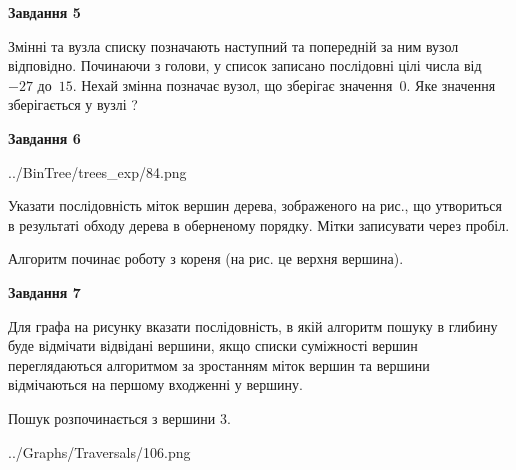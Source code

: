 \documentclass[12pt, ukrainian]{article}
\begin{document}
{\begin {large}
{\begin {center}\textbf{Завдання 5}\end {center}}\par
Змінні  та  вузла списку позначають наступний та попередній за ним вузол відповідно. Починаючи з голови, у список записано послідовні цілі числа від~$-27$ до~$15$. Нехай змінна  позначає вузол, що зберігає значення~$0$.
Яке значення зберігається у вузлі  ?\par
\newpage

{\begin {center}\textbf{Завдання 6}\end {center}}\par

\begin{center}
	{../BinTree/trees_exp/84.png}
\end{center}
Указати послідовність міток вершин дерева, зображеного на рис., що утвориться в результаті обходу дерева в оберненому порядку. Мітки записувати через пробіл.\par Алгоритм починає роботу з кореня (на рис. це верхня вершина).\par
\newpage

{\begin {center}\textbf{Завдання 7}\end {center}}\par
Для графа на рисунку вказати послідовність, в якій алгоритм пошуку в глибину буде відмічати відвідані вершини, якщо списки суміжності вершин переглядаються алгоритмом за зростанням міток вершин та вершини відмічаються на першому вход\-женні у вершину.\par
Пошук розпочинається з вершини 3.\par

\begin{center}
	{../Graphs/Traversals/106.png}
\end{center}\par
\newpage


\end{large}}
\end{document}
